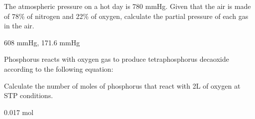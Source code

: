 \documentclass[main.tex]{subfiles}
\begin{document}
\begin{multicols*}{2}
\begin{question}[ID=\the\value{numA}]
The atmospheric pressure on a hot day is 780 mmHg. Given that the air is made of 78\% of nitrogen and 22\% of oxygen, calculate the partial pressure of each gas in the air.
\end{question}
\begin{solution}
 608 mmHg,  171.6 mmHg
\hspace{0.1cm}\end{solution}%
\begin{question}[ID=\the\value{numA}]
Phosphorus reacts with oxygen gas to produce tetraphosphorus decaoxide according to the following equation:
\begin{center} \end{center}
Calculate the number of moles of phosphorus that react with 2L of oxygen at STP conditions.
\end{question}
\begin{solution}
0.017 mol
\hspace{0.1cm}\end{solution}%


\end{multicols*}
\end{document}
